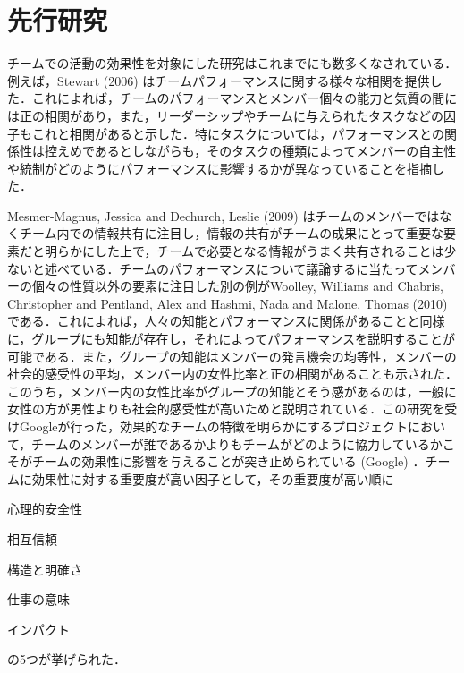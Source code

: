 \documentclass[a4paper, 11pt]{jsarticle}
\begin{document}
\section{先行研究}
チームでの活動の効果性を対象にした研究はこれまでにも数多くなされている．例えば，Stewart (2006) \cite{Stewart}はチームパフォーマンスに関する様々な相関を提供した．これによれば，チームのパフォーマンスとメンバー個々の能力と気質の間には正の相関があり，また，リーダーシップやチームに与えられたタスクなどの因子もこれと相関があると示した．特にタスクについては，パフォーマンスとの関係性は控えめであるとしながらも，そのタスクの種類によってメンバーの自主性や統制がどのようにパフォーマンスに影響するかが異なっていることを指摘した．

Mesmer-Magnus, Jessica and Dechurch, Leslie (2009) \cite{Mesmer}はチームのメンバーではなくチーム内での情報共有に注目し，情報の共有がチームの成果にとって重要な要素だと明らかにした上で，チームで必要となる情報がうまく共有されることは少ないと述べている．チームのパフォーマンスについて議論するに当たってメンバーの個々の性質以外の要素に注目した別の例がWoolley, Williams and Chabris, Christopher and Pentland, Alex and Hashmi, Nada and Malone, Thomas (2010) \cite{Woolley}である．これによれば，人々の知能とパフォーマンスに関係があることと同様に，グループにも知能が存在し，それによってパフォーマンスを説明することが可能である．また，グループの知能はメンバーの発言機会の均等性，メンバーの社会的感受性の平均，メンバー内の女性比率と正の相関があることも示された．このうち，メンバー内の女性比率がグループの知能とそう感があるのは，一般に女性の方が男性よりも社会的感受性が高いためと説明されている．この研究を受けGoogleが行った，効果的なチームの特徴を明らかにするプロジェクトにおいて，チームのメンバーが誰であるかよりもチームがどのように協力しているかこそがチームの効果性に影響を与えることが突き止められている (Google\cite{Google}) ．チームに効果性に対する重要度が高い因子として，その重要度が高い順に
\begin{inparaenum}[1)]
  \item 心理的安全性
  \item 相互信頼
  \item 構造と明確さ
  \item 仕事の意味
  \item インパクト
\end{inparaenum}
の5つが挙げられた．
\end{document}
